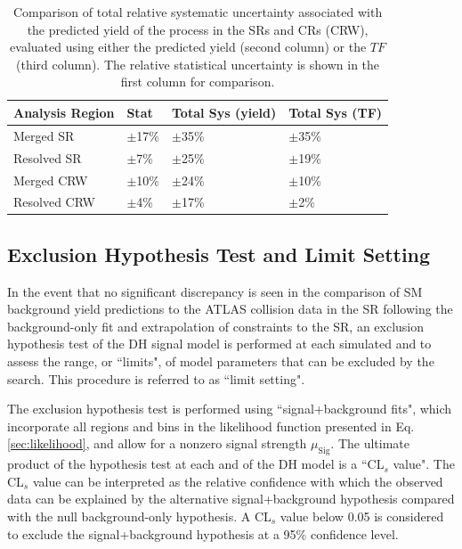 \begin{table}[ht]
\begin{center}
\caption{\label{tab:TF_sys_comp} Comparison of total relative systematic uncertainty associated with the predicted yield of the \wjets process in the SRs and \wjets CRs (CRW), evaluated using either the predicted yield (second column) or the \(TF\) (third column). The relative statistical uncertainty is shown in the first column for comparison.}
\begin{tabular}{l l l l }
\toprule
\textbf{Analysis Region} &\textbf{Stat} &\textbf{Total Sys (yield)} & \textbf{Total Sys (TF)} \tabularnewline
\midrule
\midrule
Merged SR & \(\pm\)17\% & \(\pm\)35\% & \(\pm\)35\% \tabularnewline
\midrule
Resolved SR & \(\pm\)7\% & \(\pm\)25\% & \(\pm\)19\% \tabularnewline
\midrule
Merged CRW & \(\pm\)10\% & \(\pm\)24\% & \(\pm\)10\% \tabularnewline
\midrule
Resolved CRW & \(\pm\)4\% & \(\pm\)17\% & \(\pm\)2\% \tabularnewline
\bottomrule
\end{tabular}
\end{center}
\end{table}

\subsection{Exclusion Hypothesis Test and Limit Setting}
\label{sec:hypo_test}

In the event that no significant discrepancy is seen in the comparison of SM background yield predictions to the ATLAS collision data in the SR following the background-only fit and extrapolation of constraints to the SR, an exclusion hypothesis test of the DH signal model is performed at each simulated \ms and \mZp to assess the range, or ``limits", of model parameters that can be excluded by the search. This procedure is referred to as ``limit setting".

The exclusion hypothesis test is performed using ``signal+background fits", which incorporate all regions and bins in the likelihood function presented in Eq. \ref{sec:likelihood}, and allow for a nonzero signal strength \(\mu_\text{Sig}\). The ultimate product of the hypothesis test at each \ms and \mZp of the DH model is a ``CL\(_s\) value". The CL\(_s\) value can be interpreted as the relative confidence with which the observed data can be explained by the alternative signal+background hypothesis compared with the null background-only hypothesis. A CL\(_s\) value below 0.05 is considered to exclude the signal+background hypothesis at a 95\% confidence level.


